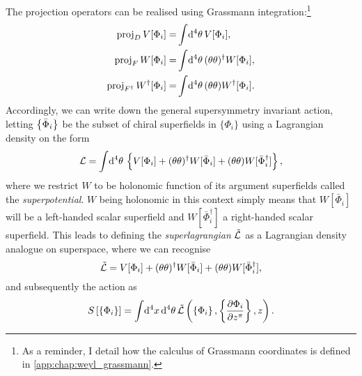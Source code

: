 \documentclass[../main.tex]{subfiles}
\begin{document}
The projection operators can be realised using Grassmann integration:\footnote{As a reminder, I detail how the calculus of Grassmann coordinates is defined in \cref{app:chap:weyl_grassmann}.}
\begin{subequations}
  \begin{align}
    \operatorname{proj}_D V[\Phi_i] =                   & \int \!\mathrm{d}^4\theta\, V[\Phi_i],                        \\
    \operatorname{proj}_F W[\Phi_i] =                   & \int \!\mathrm{d}^4\theta\, (\theta\theta)^\dagger W[\Phi_i], \\
    \operatorname{proj}_{F^\dagger} W^\dagger[\Phi_i] = & \int \!\mathrm{d}^4\theta\, (\theta\theta) W^\dagger[\Phi_i].
  \end{align}
\end{subequations}
Accordingly, we can write down the general supersymmetry invariant action, letting \(\left\{\bar\Phi_i\right\}\) be the subset of chiral superfields in \(\{\Phi_i\}\) using a Lagrangian density on the form
\begin{align}
  \label{susy:eq:general_susy_lagrangian}
  \L = \integral{^4\theta} \cclosed{V[\Phi_i] + (\theta\theta)^\dagger W[\bar\Phi_i] + (\theta\theta) W[\bar\Phi_i^\dagger]},
\end{align}
where we restrict \(W\) to be holonomic function of its argument superfields called the \emph{superpotential}.
\(W\) being holonomic in this context simply means that \(W[\bar\Phi_i]\) will be a left-handed scalar superfield and \(W[\bar\Phi_i^\dagger]\) a right-handed scalar superfield.
This leads to defining the \emph{superlagrangian} \(\tilde{\mathcal{L}}\) as a Lagrangian density analogue on superspace, where we can recognise
\begin{equation}
  \label{susy:eq:superlagrangian}
  \tilde\L = V[\Phi_i] + (\theta\theta)^\dagger W[\bar\Phi_i] + (\theta\theta) W[\bar\Phi_i^\dagger],
\end{equation}
and subsequently the action as
\begin{equation}
  \label{susy:eq:susy_action}
  S\bclosed{\cclosed{\Phi_i}} = \integral{^4x\,\mathrm{d}^4\theta} \tilde\L\pclosed{\cclosed{\Phi_i}, \cclosed{\pd[z^\pi]{\Phi_i}}, z}.
\end{equation}
\end{document}
